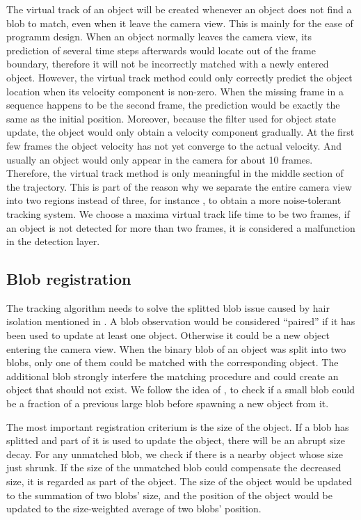 The virtual track of an object will be created whenever an object does not find a blob to match, even when it leave the camera view. This is mainly for the ease of programm design. When an object normally leaves the camera view, its prediction of several time steps afterwards would locate out of the frame boundary, therefore it will not be incorrectly matched with a newly entered object. However, the virtual track method could only correctly predict the object location when its velocity component is non-zero. When the missing frame in a sequence happens to be the second frame, the prediction would be exactly the same as the initial position. Moreover, because the filter used for object state update, the object would only obtain a velocity component gradually. At the first few frames the object velocity has not yet converge to the actual velocity. And usually an object would only appear in the camera for about 10 frames. Therefore, the virtual track method is only meaningful in the middle section of the trajectory. This is part of the reason why we separate the entire camera view into two regions instead of three, for instance \cite{mika}, to obtain a more noise-tolerant tracking system. We choose a maxima virtual track life time to be two frames, if an object is not detected for more than two frames, it is considered a malfunction in the detection layer.

\subsection{Blob registration}
The tracking algorithm needs to solve the splitted blob issue caused by hair isolation mentioned in . A blob observation would be considered ``paired'' if it has been used to update at least one object. Otherwise it could be a new object entering the camera view. When the binary blob of an object was split into two blobs, only one of them could be matched with the corresponding object. The additional blob strongly interfere the matching procedure and could create an object that should not exist. We follow the idea of \citeauthor{sharma2012blob} \cite{sharma2012blob}, to check if a small blob could be a fraction of a previous large blob before spawning a new object from it.

The most important registration criterium is the size of the object. If a blob has splitted and part of it is used to update the object, there will be an abrupt size decay. For any unmatched blob, we check if there is a nearby object whose size just shrunk. If the size of the unmatched blob could compensate the decreased size, it is regarded as part of the object. The size of the object would be updated to the summation of two blobs' size, and the position of the object would be updated to the size-weighted average of two blobs' position.
